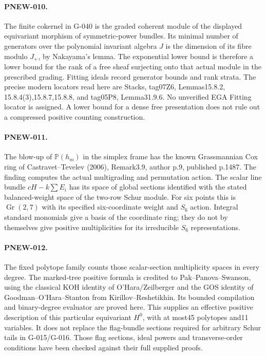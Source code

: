 \paragraph{PNEW-010.}
The finite cokernel in G-040 is the graded coherent module of
the displayed equivariant morphism of symmetric-power bundles.
Its minimal number of generators over the polynomial invariant
algebra $J$ is the dimension of its fibre modulo $J_+$, by
Nakayama's lemma.  The exponential lower bound is therefore
a lower bound for the rank of a free sheaf surjecting onto
that actual module in the prescribed grading.  Fitting ideals
record generator bounds and rank strata.  The precise modern
locators read here are Stacks, tag07Z6, Lemmas15.8.2,
15.8.4(3),15.8.7,15.8.8, and tag05P8, Lemma31.9.6.
No unverified EGA Fitting locator is assigned.  A lower bound
for a dense free presentation does not rule out a compressed
positive counting construction.

\paragraph{PNEW-011.}
The blow-up of $\mathbb P(h_m)$ in the simplex frame has the
known Grassmannian Cox ring of Castravet--Tevelev (2006),
Remark3.9, author p.9, published p.1487.  The finding computes
the actual multigrading and permutation action.  The scalar
line bundle $cH-k\sum E_i$ has its space of global sections
identified with the stated balanced-weight space of the
two-row Schur module.  For six points this is $\operatorname{Gr}(2,7)$
with its specified six-coordinate weight and $S_6$ action.
Integral standard monomials give a basis of the coordinate
ring; they do not by themselves give positive multiplicities
for its irreducible $S_6$ representations.

\paragraph{PNEW-012.}
The fixed polytope family counts those scalar-section
multiplicity spaces in every degree.  The marked-tree positive
formula is credited to Pak--Panova--Swanson, using the classical
KOH identity of O'Hara/Zeilberger and the GOS identity of
Goodman--O'Hara--Stanton from Kirillov--Reshetikhin.
Its bounded compilation and
binary-degree evaluator are proved here.  This supplies an
effective positive description of this particular equivariant
$H^0$, with at most45 polytopes and11 variables.  It does not
replace the flag-bundle sections required for arbitrary
Schur tails in G-015/G-016.  Those flag sections, ideal powers
and transverse-order conditions have been checked against
their full supplied proofs.

